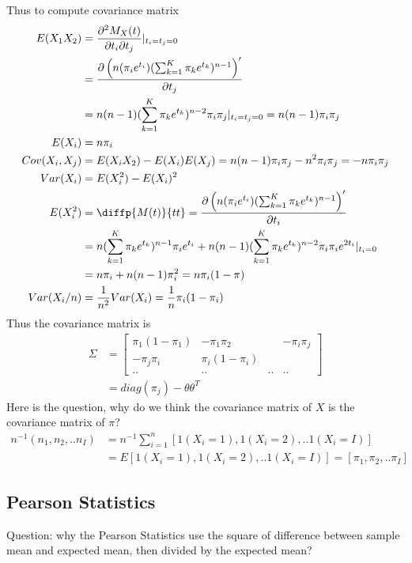 	Thus to compute covariance matrix
	\begin{align*}
		E(X_1 X_2) &= \frac{\partial^2 M_X(t)}{\partial t_i \partial t_j}|_{t_i = t_j = 0}\\
		&= \frac{\partial \left(n(\pi_ie^{t_i})(\sum_{k=1}^K \pi_ke^{t_k})^{n-1} \right)'}{\partial t_j}\\
		&= n(n-1)(\sum_{k=1}^K \pi_ke^{t_k})^{n-2}\pi_i\pi_j|_{t_i = t_j = 0} = n(n-1)\pi_i\pi_j\\
		E(X_i) &= n\pi_i\\
		Cov(X_i, X_j) &= E(X_i X_2) - E(X_i)E(X_j) = n(n-1)\pi_i\pi_j - n^2 \pi_i\pi_j = -n\pi_i\pi_j\\
		Var(X_i) &= E(X_i^2) - E(X_i)^2 \\
		E(X_i^2) &= \diffp{M(t)}{t t} = \frac{\partial \left(n(\pi_ie^{t_i})(\sum_{k=1}^K \pi_ke^{t_k})^{n-1} \right)'}{\partial t_i}\\
		&= n(\sum_{k=1}^K \pi_ke^{t_k})^{n-1}\pi_i e^{t_i}+ n(n-1)(\sum_{k=1}^K \pi_ke^{t_k})^{n-2}\pi_i\pi_i e^{2t_i}|_{t_i = 0} \\
		&= n\pi_i + n(n-1)\pi_i^2 = n\pi_i(1-\pi)\\
		Var(X_i/n) &= \frac{1}{n^2} Var(X_i) = \frac{1}{n}\pi_i(1-\pi_i)
	\end{align*}
	Thus the covariance matrix is
	\begin{align*}
		\Sigma &= \begin{bmatrix}
			\pi_1(1-\pi_1) &  -\pi_1\pi_2&  & -\pi_i\pi_j \\
			-\pi_j\pi_i&  \pi_i(1-\pi_i)&   &  \\
			..& ..&..&..
		\end{bmatrix}\\
		&= diag{(\pi_j) - \theta \theta^T}
	\end{align*}
	Here is the question, why do we think the covariance matrix of $X$ is the covariance matrix of $\pi$?
	\begin{align*}
		n^{-1} (n_1, n_2, ..n_I) &= n^{-1} \sum_{i=1}^n[ 1 (X_{i}=1), 1 (X_{i}=2), ..1 (X_{i}=I)] \\
		&= E[1 (X_{i}=1), 1 (X_{i}=2), ..1 (X_{i}=I) ] = [\pi_1, \pi_2, .. \pi_I] 
	\end{align*}


	\subsection{Pearson Statistics}
	Question: why the Pearson Statistics use the square of difference between sample mean and expected mean, then divided by the expected mean? \\
	
